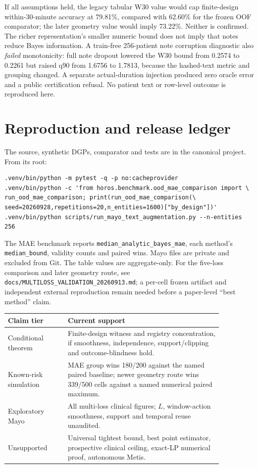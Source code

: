 \documentclass[10pt]{article}
\begin{document}
If all assumptions held, the legacy tabular W30 value would cap finite-design within-30-minute accuracy at 79.81\%, compared with 62.60\% for the frozen OOF comparator; the later geometry value would imply 73.22\%. Neither is confirmed. The richer representation's smaller numeric bound does not imply that notes reduce Bayes information. A train-free 256-patient note corruption diagnostic also \emph{failed} monotonicity: full note dropout lowered the W30 bound from 0.2574 to 0.2261 but raised q90 from 1.6756 to 1.7813, because the hashed-text metric and grouping changed. A separate actual-duration injection produced zero oracle error and a public certification refusal. No patient text or row-level outcome is reproduced here.

\section{Reproduction and release ledger}
The source, synthetic DGPs, comparator and tests are in the canonical project. From its root:
\begin{verbatim}
.venv/bin/python -m pytest -q -p no:cacheprovider
.venv/bin/python -c 'from horos.benchmark.ood_mae_comparison import \
run_ood_mae_comparison; print(run_ood_mae_comparison(\
seed=20260928,repetitions=20,n_entities=1600)["by_design"])'
.venv/bin/python scripts/run_mayo_text_augmentation.py --n-entities 256
\end{verbatim}
The MAE benchmark reports \texttt{median\_analytic\_bayes\_mae}, each method's \texttt{median\_bound}, validity counts and paired wins. Mayo files are private and excluded from Git. The table values are aggregate-only. For the five-loss comparison and later geometry route, see \texttt{docs/MULTILOSS\_VALIDATION\_20260913.md}; a per-cell frozen artifact and independent external reproduction remain needed before a paper-level ``best method'' claim.

\begin{center}
\begin{tabular}{p{0.24\linewidth}p{0.62\linewidth}}
\toprule
Claim tier & Current support \\
\midrule
Conditional theorem & Finite-design witness and registry concentration, if smoothness, independence, support/clipping and outcome-blindness hold. \\
Known-risk simulation & MAE group wins 180/200 against the named paired baseline; newer geometry route wins 339/500 cells against a named numerical paired maximum. \\
Exploratory Mayo & All multi-loss clinical figures; $L$, window-action smoothness, support and temporal reuse unaudited. \\
Unsupported & Universal tightest bound, best point estimator, prospective clinical ceiling, exact-LP numerical proof, autonomous Metis. \\
\bottomrule
\end{tabular}
\end{center}
\end{document}
